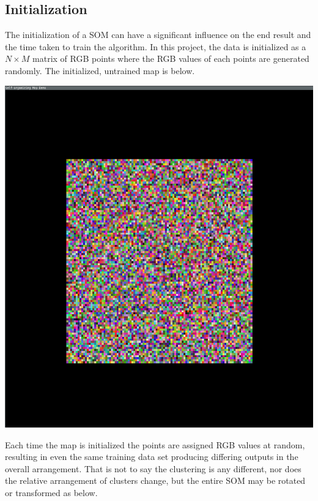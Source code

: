 \documentclass[11pt]{article}
\begin{document}
\subsection{Initialization}
The initialization of a SOM can have a significant influence on the end result and the time taken to train the algorithm. In this project, the data is initialized as a \(N \times M\) matrix of RGB points where the RGB values of each points are generated randomly. The initialized, untrained map is below.
\begin{center}
\includegraphics[scale=.15]{cuda_som_init}
\end{center}
Each time the map is initialized the points are assigned RGB values at random, resulting in even the same training data set producing differing outputs in the overall arrangement. That is not to say the clustering is any different, nor does the relative arrangement of clusters change, but the entire SOM may be rotated or transformed as below. 
\end{document}

